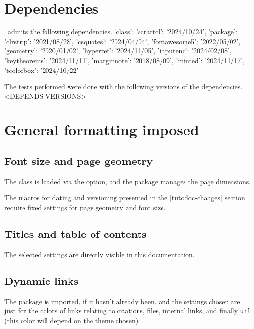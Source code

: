 \newpage
\tableofcontents
\newpage


\section{Dependencies}

\thisproj\ admits the following dependencies.
{'class': {'scrartcl': '2024/10/24'}, 'package': {'clrstrip': '2021/08/28', 'csquotes': '2024/04/04', 'fontawesome5': '2022/05/02', 'geometry': '2020/01/02', 'hyperref': '2024/11/05', 'inputenc': '2024/02/08', 'keytheorems': '2024/11/11', 'marginnote': '2018/08/09', 'minted': '2024/11/17', 'tcolorbox': '2024/10/22'}}

\begin{tdocnote}
    The tests performed were done with the following versions of the dependencies.
    <DEPENDS-VERSIONS>
\end{tdocnote}


\section{General formatting imposed}

\subsection{Font size and page geometry}

The  class is loaded via the  option, and the  package manages the page dimensions.


\begin{tdocwarn}
	The macros for dating and versioning presented in the \ref{tutodoc-changes} section require fixed settings for page geometry and font size.
\end{tdocwarn}


\subsection{Titles and table of contents}

The selected settings are directly visible in this documentation.


\subsection{Dynamic links}

The  package is imported, if it hasn't already been, and the settings chosen are just for the colors of links relating to citations, files, internal links, and finally \verb#url# (this color will depend on the theme chosen).


